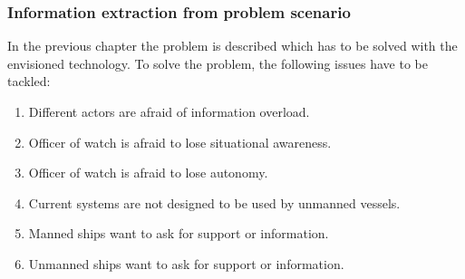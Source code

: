 \subsubsection{Information extraction from problem scenario}
In the previous chapter the problem is described which has to be solved with the envisioned technology. To solve the problem, the following issues have to be tackled:
\begin{spacing}{1}
\begin{enumerate}
	\item Different actors are afraid of information overload.
	\item Officer of watch is afraid to lose situational awareness.
	\item Officer of watch is afraid to lose autonomy.
	\item Current systems are not designed to be used by unmanned vessels.
	\item Manned ships want to ask for support or information.
	\item Unmanned ships want to ask for support or information.
\end{enumerate}
\end{spacing}

